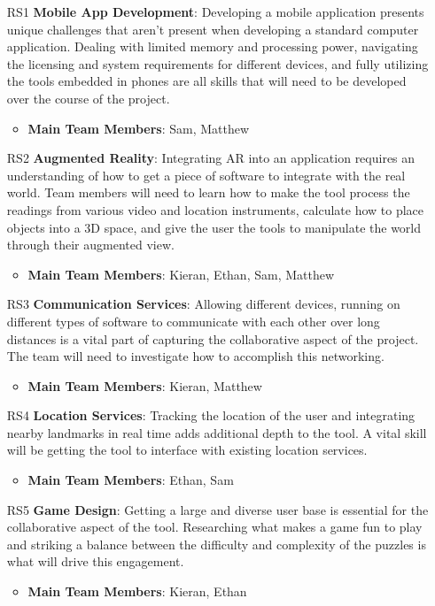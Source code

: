 \documentclass[12pt]{article}
\begin{document}
\begin{itemize}
    \item [RS1]\textbf{Mobile App Development}: Developing a mobile application presents unique challenges that aren't present when developing a standard computer application. Dealing with limited memory and processing power, navigating the licensing and system requirements for different devices, and fully utilizing the tools embedded in phones are all skills that will need to be developed over the course of the project. 
    \begin{itemize}
        \item \textbf{Main Team Members}: Sam, Matthew
    \end{itemize}
    \item [RS2]\textbf{Augmented Reality}: Integrating AR into an application requires an understanding of how to get a piece of software to integrate with the real world. Team members will need to learn how to make the tool process the readings from various video and location instruments, calculate how to place objects into a 3D space, and give the user the tools to manipulate the world through their augmented view. 
    \begin{itemize}
        \item \textbf{Main Team Members}: Kieran, Ethan, Sam, Matthew
    \end{itemize}
    \item [RS3]\textbf{Communication Services}: Allowing different devices, running on different types of software to communicate with each other over long distances is a vital part of capturing the collaborative aspect of the project. The team will need to investigate how to accomplish this networking. 
    \begin{itemize}
        \item \textbf{Main Team Members}: Kieran, Matthew
    \end{itemize}
    \item [RS4]\textbf{Location Services}: Tracking the location of the user and integrating nearby landmarks in real time adds additional depth to the tool. A vital skill will be getting the tool to interface with existing location services. 
    \begin{itemize}
        \item \textbf{Main Team Members}: Ethan, Sam
    \end{itemize}
    \item [RS5]\textbf{Game Design}: Getting a large and diverse user base is essential for the collaborative aspect of the tool. Researching what makes a game fun to play and striking a balance between the difficulty and complexity of the puzzles is what will drive this engagement. 
    \begin{itemize}
        \item \textbf{Main Team Members}: Kieran, Ethan
    \end{itemize}
\end{itemize}
\end{document}
